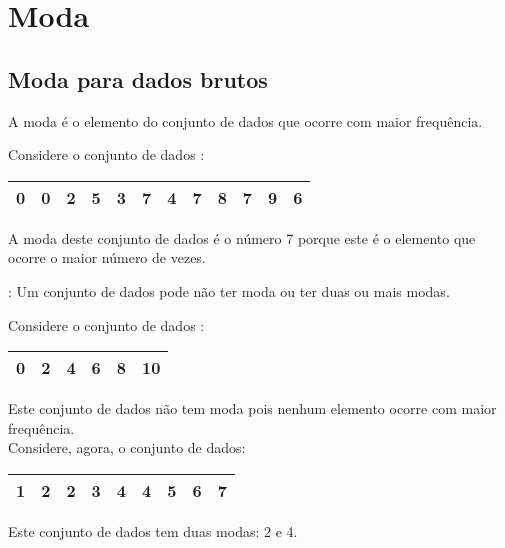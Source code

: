 \documentclass[11pt,fleqn]{book} %
\begin{document}

\section{Moda}
\vspace{0,3cm}

\subsection{Moda para dados brutos}
\vspace{0,3cm}

A moda é o elemento do conjunto de dados que ocorre com maior frequência. \\

\begin{example}

Considere o conjunto de dados :

\begin{center}
	\begin{tabular}{c c c c c c c c c c c c}
	\hline
	0 & 0 & 2 & 5 & 3 & 7 & 4 & 7 & 8 & 7 & 9 & 6 \\
	\hline
	\end{tabular}
\end{center}

A moda deste conjunto de dados é o número 7  porque este é o elemento que ocorre o maior número de vezes.

\end{example}

\vspace{0,3cm}

: Um conjunto de dados pode não ter moda ou ter duas ou mais modas. \\

\begin{example}

Considere o conjunto de dados :

\begin{center}
	\begin{tabular}{c c c c c c}
	\hline
	0 & 2 & 4 & 6 & 8 & 10 \\
	\hline
	\end{tabular}
\end{center}

Este conjunto de dados não tem moda pois nenhum elemento ocorre com maior frequência. \\

Considere, agora, o conjunto de dados:

\begin{center}
	\begin{tabular}{c c c c c c c c c}
	\hline
	1 & 2 & 2 & 3 & 4 & 4 & 5 & 6 & 7 \\
	\hline
	\end{tabular}
\end{center}

Este conjunto de dados tem duas modas: 2 e 4.

\end{example}
\end{document}
